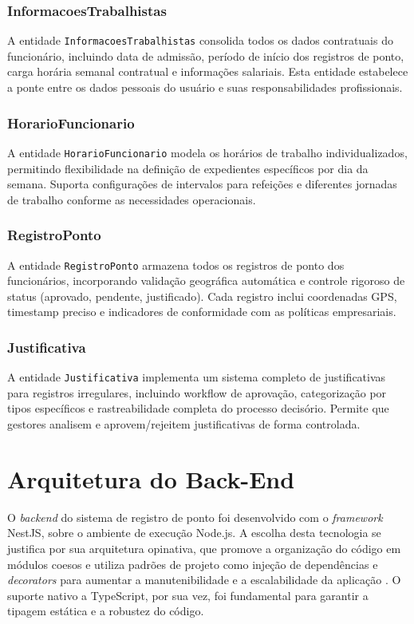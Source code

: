 \subsubsection{InformacoesTrabalhistas}

A entidade \texttt{InformacoesTrabalhistas} consolida todos os dados contratuais do funcionário, incluindo data de admissão, período de início dos registros de ponto, carga horária semanal contratual e informações salariais. Esta entidade estabelece a ponte entre os dados pessoais do usuário e suas responsabilidades profissionais.

\subsubsection{HorarioFuncionario}

A entidade \texttt{HorarioFuncionario} modela os horários de trabalho individualizados, permitindo flexibilidade na definição de expedientes específicos por dia da semana. Suporta configurações de intervalos para refeições e diferentes jornadas de trabalho conforme as necessidades operacionais.

\subsubsection{RegistroPonto}

A entidade \texttt{RegistroPonto} armazena todos os registros de ponto dos funcionários, incorporando validação geográfica automática e controle rigoroso de status (aprovado, pendente, justificado). Cada registro inclui coordenadas GPS, timestamp preciso e indicadores de conformidade com as políticas empresariais.

\subsubsection{Justificativa}

A entidade \texttt{Justificativa} implementa um sistema completo de justificativas para registros irregulares, incluindo workflow de aprovação, categorização por tipos específicos e rastreabilidade completa do processo decisório. Permite que gestores analisem e aprovem/rejeitem justificativas de forma controlada.

\section{Arquitetura do Back-End}

O \textit{backend} do sistema de registro de ponto foi desenvolvido com o \textit{framework} NestJS, sobre o ambiente de execução Node.js. A escolha desta tecnologia se justifica por sua arquitetura opinativa, que promove a organização do código em módulos coesos e utiliza padrões de projeto como injeção de dependências e \textit{decorators} para aumentar a manutenibilidade e a escalabilidade da aplicação \cite{NestJS2024}. O suporte nativo a TypeScript, por sua vez, foi fundamental para garantir a tipagem estática e a robustez do código.

